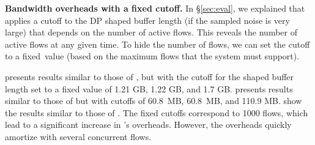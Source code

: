 {\small
\textbf{Bandwidth overheads with a fixed cutoff.}
In \S\ref{sec:eval}, we explained that {\sys} applies a cutoff to the DP
shaped buffer length (if the sampled noise is very large) that depends on the
number of active flows. This reveals the number of active flows at any given
time.
To hide the number of flows, we can set
the cutoff to a fixed~value (\eg based on the
maximum flows that the system must support).

 presents results similar to those of
, but with the cutoff for the shaped buffer
length set to a fixed value of 1.21 GB, 1.22 GB, and 1.7 GB.
 presents results similar to those of
 but with cutoffs of 60.8~MB, 60.8~MB, and 110.9
MB.
%
 show
the results similar to those of
.
%
The fixed cutoffs correspond to 1000 flows, which lead to a significant increase
in {\sys}'s overheads.
However, the overheads quickly amortize with several concurrent flows.
}

